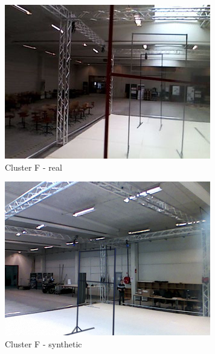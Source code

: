\begin{figure}[h!]
   \begin{subfigure}{0.32\textwidth}
      \includegraphics[width=\textwidth]{figure/tsne_random/F/1.png}
      \caption{Cluster F - real}
   \end{subfigure}
   \begin{subfigure}{0.32\textwidth}
      \includegraphics[width=\textwidth]{figure/tsne_random/F/9.png}
      \caption{Cluster F - synthetic}
   \end{subfigure}
   \begin{subfigure}{0.32\textwidth}

\end{subfigure}
\end{figure}
